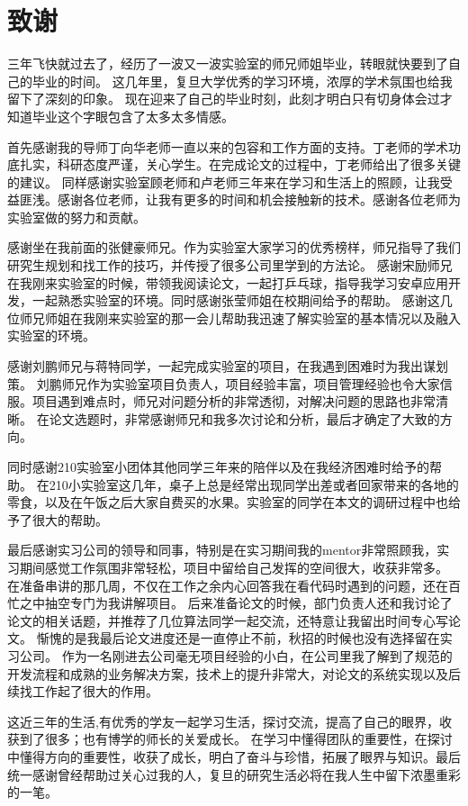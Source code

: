 \chapter*{致谢}

三年飞快就过去了，经历了一波又一波实验室的师兄师姐毕业，转眼就快要到了自己的毕业的时间。 
这几年里，复旦大学优秀的学习环境，浓厚的学术氛围也给我留下了深刻的印象。
现在迎来了自己的毕业时刻，此刻才明白只有切身体会过才知道毕业这个字眼包含了太多太多情感。

首先感谢我的导师丁向华老师一直以来的包容和工作方面的支持。丁老师的学术功底扎实，科研态度严谨，关心学生。在完成论文的过程中，丁老师给出了很多关键的建议。
同样感谢实验室顾老师和卢老师三年来在学习和生活上的照顾，让我受益匪浅。感谢各位老师，让我有更多的时间和机会接触新的技术。感谢各位老师为实验室做的努力和贡献。

感谢坐在我前面的张健豪师兄。作为实验室大家学习的优秀榜样，师兄指导了我们研究生规划和找工作的技巧，并传授了很多公司里学到的方法论。
感谢宋励师兄在我刚来实验室的时候，带领我阅读论文，一起打乒乓球，指导我学习安卓应用开发，一起熟悉实验室的环境。同时感谢张莹师姐在校期间给予的帮助。
感谢这几位师兄师姐在我刚来实验室的那一会儿帮助我迅速了解实验室的基本情况以及融入实验室的环境。

感谢刘鹏师兄与蒋特同学，一起完成实验室的项目，在我遇到困难时为我出谋划策。
刘鹏师兄作为实验室项目负责人，项目经验丰富，项目管理经验也令大家信服。项目遇到难点时，师兄对问题分析的非常透彻，对解决问题的思路也非常清晰。
在论文选题时，非常感谢师兄和我多次讨论和分析，最后才确定了大致的方向。

同时感谢210实验室小团体其他同学三年来的陪伴以及在我经济困难时给予的帮助。
在210小实验室这几年，桌子上总是经常出现同学出差或者回家带来的各地的零食，以及在午饭之后大家自费买的水果。实验室的同学在本文的调研过程中也给予了很大的帮助。

最后感谢实习公司的领导和同事，特别是在实习期间我的mentor非常照顾我，实习期间感觉工作氛围非常轻松，项目中留给自己发挥的空间很大，收获非常多。
在准备串讲的那几周，不仅在工作之余内心回答我在看代码时遇到的问题，还在百忙之中抽空专门为我讲解项目。
后来准备论文的时候，部门负责人还和我讨论了论文的相关话题，并推荐了几位算法同学一起交流，还特意让我留出时间专心写论文。
惭愧的是我最后论文进度还是一直停止不前，秋招的时候也没有选择留在实习公司。
作为一名刚进去公司毫无项目经验的小白，在公司里我了解到了规范的开发流程和成熟的业务解决方案，技术上的提升非常大，对论文的系统实现以及后续找工作起了很大的作用。




这近三年的生活,有优秀的学友一起学习生活，探讨交流，提高了自己的眼界，收获到了很多；也有博学的师长的关爱成长。
在学习中懂得团队的重要性，在探讨中懂得方向的重要性，收获了成长，明白了奋斗与珍惜，拓展了眼界与知识。最后统一感谢曾经帮助过关心过我的人，复旦的研究生活必将在我人生中留下浓墨重彩的一笔。